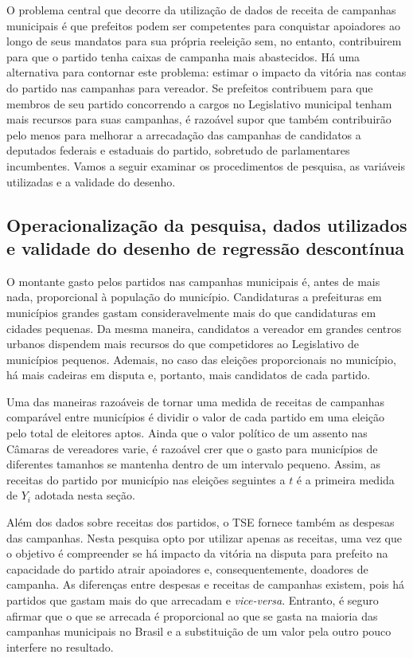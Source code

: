 O problema central que decorre da utilização de dados de receita de campanhas municipais é que prefeitos podem ser competentes para conquistar apoiadores ao longo de seus mandatos para sua própria reeleição sem, no entanto, contribuirem para que o partido tenha caixas de campanha mais abastecidos. Há uma alternativa para contornar este problema: estimar o impacto da vitória nas contas do partido nas campanhas para vereador. Se prefeitos contribuem para que membros de seu partido concorrendo a cargos no Legislativo municipal tenham mais recursos para suas campanhas, é razoável supor que também contribuirão pelo menos para melhorar a arrecadação das campanhas de candidatos a deputados federais e estaduais do partido, sobretudo de parlamentares incumbentes. Vamos a seguir examinar os procedimentos de pesquisa, as variáveis utilizadas e a validade do desenho.

\subsection{Operacionalização da pesquisa, dados utilizados e validade do desenho de regressão descontínua}

O montante gasto pelos partidos nas campanhas municipais é, antes de mais nada, proporcional à população do município. Candidaturas a prefeituras em municípios grandes gastam consideravelmente mais do que candidaturas em cidades pequenas. Da mesma maneira, candidatos a vereador em grandes centros urbanos dispendem mais recursos do que competidores ao Legislativo de municípios pequenos. Ademais, no caso das eleições proporcionais no município, há mais cadeiras em disputa e, portanto, mais candidatos de cada partido.

Uma das maneiras razoáveis de tornar uma medida de receitas de campanhas comparável entre municípios é dividir o valor de cada partido em uma eleição pelo total de eleitores aptos. Ainda que o valor político de um assento nas Câmaras de vereadores varie, é razoável crer que o gasto para municípios de diferentes tamanhos se mantenha dentro de um intervalo pequeno. Assim, as receitas do partido por município nas eleições seguintes a $t$ é a primeira medida de $Y_{i}$ adotada nesta seção.

Além dos dados sobre receitas dos partidos, o TSE fornece também as despesas das campanhas. Nesta pesquisa opto por utilizar apenas as receitas, uma vez que o objetivo é compreender se há impacto da vitória na disputa para prefeito na capacidade do partido atrair apoiadores e, consequentemente, doadores de campanha. As diferenças entre despesas e receitas de campanhas existem, pois há partidos que gastam mais do que arrecadam e \emph{vice-versa}. Entranto, é seguro afirmar que o que se arrecada é proporcional ao que se gasta na maioria das campanhas municipais no Brasil e a substituição de um valor pela outro pouco interfere no resultado.

